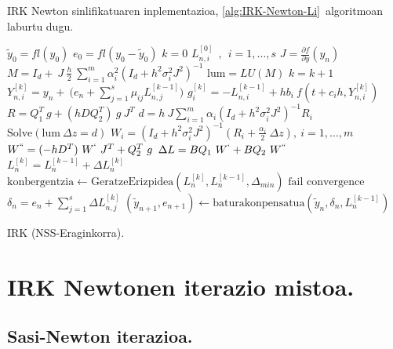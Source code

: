 \begin{enumerate}
\end{enumerate}


IRK Newton sinlifikatuaren inplementazioa, \ref{alg:IRK-Newton-Li}~algoritmoan laburtu dugu. 

\begin{algorithm}[h!]
 \BlankLine
  $\tilde{y}_0=fl(y_0)$\;
  $e_0=fl(y_0-\tilde{y}_0)$\;
  {
   \BlankLine
   $k=0$\;
     $L_{n,i}^{[0]} \ \ , \ \ i=1,\dots,s $\;
   \BlankLine
   $J=\frac{\partial f}{\partial y}(y_n) $\; 
   \BlankLine
   $ M=I_d+ \ J \ \frac{h}{2}\ \sum\limits_{i=1}^{m} \alpha_i^2 (I_d+h^2 \sigma_i^2 J^2)^{-1} $\;
   $ \mathrm{lum}=LU(M)$\;
   \BlankLine  
   {
    \BlankLine 
    $k=k+1$\;
    $Y_{n,i}^{[k]}=y_{n} + \ \big(e_n+\sum\limits_{j=1}^{s} \mu_{ij} L_{n,j}^{[k-1]}\big)  $\;  
    \BlankLine
    $g_i^{[k]}= -L_{n,i}^{[k-1]}+ hb_i \ f(t+c_ih, Y_{n,i}^{[k]}) $\;
    \BlankLine
    $R=Q_1^T \ g  + (h D Q_2^T) \ g \ J^T $\;
    $d=h \ J \sum\limits_{i=1}^{m}\alpha_i (I_d+h^2\sigma_i^2J^2)^{-1}R_i$\;
    $\text{Solve}(\mathrm{lum} \ \Delta z = d)$\;
    \BlankLine 
    $W_i=(I_d+h^2\sigma_i^2J^2)^{-1} (R_i+\frac{\alpha_i}{2} \ \Delta z), \ i=1,\dots,m$\;
    \BlankLine
    $W^{``}= (-hD^T) \ W^{`} \ J^T+Q_2^T \ g$\;
    \BlankLine
    $\Delta L =B Q_1 \ W^{`}+B Q_2 \ W^{``} $\;
    $L_n^{[k]}=L_n^{[k-1]}+\Delta L_n^{[k]}$\;
    $\text{konbergentzia} \leftarrow \text{GeratzeErizpidea}(L_n^{[k]},L_n^{[k-1]},\Delta_{min}) $\;
   }
 \BlankLine
   {
    {$\text{fail convergence}$\;}
   }
   $\delta_{n}={e}_{n} + \sum\limits_{j=1}^{s}\Delta L_{n,j}^{[k]}$\;
   $(\tilde y_{n+1}, e_{n+1})\leftarrow \text{baturakonpensatua}(\tilde y_{n},\delta_{n},L_{n}^{[k-1]})$\;
 }
 \caption{IRK (NSS-Eraginkorra).}
 \label{alg:IRK-Newton-Li}
\end{algorithm}


\clearpage


\section{IRK Newtonen iterazio mistoa.}
\label{sec:7.6}

\subsection{Sasi-Newton iterazioa.}


